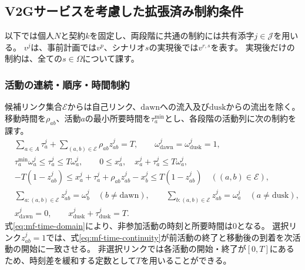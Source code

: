 \subsection{V2Gサービスを考慮した拡張済み制約条件}
\label{subsec:constraints_of_the_v2g_contract}

以下では個人$N$と契約$k$を固定し、両段階に共通の制約には共有添字$j\in\mathcal J$を用いる。
$v^j$は、事前計画では$v^p$、シナリオ$s$の実現後では$v^{r,s}$を表す。
実現後だけの制約は、全ての$s\in\Omega$について課す。

\subsubsection{活動の連続・順序・時間制約}

候補リンク集合$\mathcal E$からは自己リンク、$\mathrm{dawn}$への流入及び$\mathrm{dusk}$からの流出を除く。
移動時間を$\rho_{ab}$、活動$a$の最小所要時間を$\tau_a^{\min}$とし、各段階の活動列に次の制約を課す。
\begin{align}
 &\sum_{a\in A}\tau_a^j+
   \sum_{(a,b)\in\mathcal E}\rho_{ab}z_{ab}^j=T,
 \qquad \omega_{\mathrm{dawn}}^j=\omega_{\mathrm{dusk}}^j=1,
 \label{eq:mf-time-budget}\\
 &\tau_a^{\min}\omega_a^j\le\tau_a^j\le T\omega_a^j,
 \qquad 0\le x_a^j,\quad x_a^j+\tau_a^j\le T\omega_a^j,
 \label{eq:mf-time-domain}\\
 &-T(1-z_{ab}^j)\le
 x_a^j+\tau_a^j+\rho_{ab}z_{ab}^j-x_b^j
 \le T(1-z_{ab}^j)
 \quad((a,b)\in\mathcal E),
 \label{eq:mf-time-continuity}\\
 &\sum_{a:(a,b)\in\mathcal E}z_{ab}^j=\omega_b^j
 \quad(b\ne\mathrm{dawn}),\qquad
 \sum_{b:(a,b)\in\mathcal E}z_{ab}^j=\omega_a^j
 \quad(a\ne\mathrm{dusk}),
 \label{eq:mf-flow}\\
 &x_{\mathrm{dawn}}^j=0,\qquad
 x_{\mathrm{dusk}}^j+\tau_{\mathrm{dusk}}^j=T.
 \label{eq:mf-time-anchor}
\end{align}
式\eqref{eq:mf-time-domain}により、非参加活動の時刻と所要時間は0となる。
選択リンク$z_{ab}^j=1$では、式\eqref{eq:mf-time-continuity}が前活動の終了と移動後の到着を次活動の開始に一致させる。
非選択リンクでは各活動の開始・終了が$[0,T]$にあるため、時刻差を緩和する定数として$T$を用いることができる。

